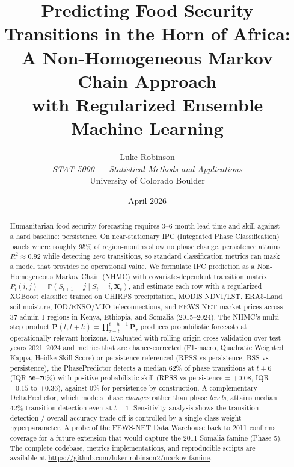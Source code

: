 \documentclass[11pt,letterpaper]{article}
\title{Predicting Food Security Transitions in the Horn of Africa:\\
A Non-Homogeneous Markov Chain Approach\\with Regularized Ensemble Machine Learning}
\author{Luke Robinson\\
\textit{STAT 5000 — Statistical Methods and Applications}\\
University of Colorado Boulder}
\date{April 2026}
\newcommand{\Prob}{\mathbb{P}}
\begin{document}
\maketitle

\begin{abstract}
Humanitarian food-security forecasting requires 3--6 month lead time and skill against a hard baseline: persistence. On near-stationary IPC (Integrated Phase Classification) panels where roughly 95\% of region-months show no phase change, persistence attains $R^2 \approx 0.92$ while detecting \emph{zero} transitions, so standard classification metrics can mask a model that provides no operational value. We formulate IPC prediction as a Non-Homogeneous Markov Chain (NHMC) with covariate-dependent transition matrix $P_t(i,j) = \Prob(S_{t+1} = j \mid S_t = i, \mathbf{X}_t)$, and estimate each row with a regularized XGBoost classifier trained on CHIRPS precipitation, MODIS NDVI/LST, ERA5-Land soil moisture, IOD/ENSO/MJO teleconnections, and FEWS-NET market prices across 37 admin-1 regions in Kenya, Ethiopia, and Somalia (2015--2024). The NHMC's multi-step product $\mathbf{P}(t, t+h) = \prod_{\tau=t}^{t+h-1} \mathbf{P}_\tau$ produces probabilistic forecasts at operationally relevant horizons. Evaluated with rolling-origin cross-validation over test years 2021--2024 and metrics that are chance-corrected (F1-macro, Quadratic Weighted Kappa, Heidke Skill Score) or persistence-referenced (RPSS-vs-persistence, BSS-vs-persistence), the PhasePredictor detects a median 62\% of phase transitions at $t\!+\!6$ (IQR 56--70\%) with positive probabilistic skill (RPSS-vs-persistence = +0.08, IQR $-0.15$ to $+0.36$), against 0\% for persistence by construction. A complementary DeltaPredictor, which models phase \emph{changes} rather than phase \emph{levels}, attains median 42\% transition detection even at $t\!+\!1$. Sensitivity analysis shows the transition-detection / overall-accuracy trade-off is controlled by a single class-weight hyperparameter. A probe of the FEWS-NET Data Warehouse back to 2011 confirms coverage for a future extension that would capture the 2011 Somalia famine (Phase 5). The complete codebase, metrics implementations, and reproducible scripts are available at \url{https://github.com/luker-robinson2/markov-famine}.
\end{abstract}

\bigskip
\end{document}
